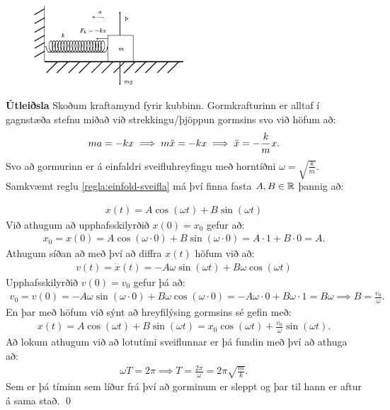 \ifdefined \wholebook \else\documentclass[oneside]{book}\usepackage{EdlBook}\graphicspath{{figures/}}
\begin{document}
\begin{minipage}{\linewidth}

\begin{figure}
\includegraphics[width=2.2in]{figures/forces-spring.pdf}
\end{figure}

\textbf{Útleiðsla} Skoðum kraftamynd fyrir kubbinn. Gormkrafturinn er alltaf í gagnstæða stefnu miðað við strekkingu/þjöppun gormsins svo við höfum að:
\begin{align*}
    ma = -kx \implies m\Ddot{x} = -kx \implies \Ddot{x} = - \frac{k}{m}x.
\end{align*}
Svo að gormurinn er á einfaldri sveifluhreyfingu með horntíðni $\omega = \sqrt{\frac{k}{m}}$. Samkvæmt reglu \ref{regla:einfold-sveifla} má því finna fasta $A, B \in \mathbb{R}$ þannig að:
\end{minipage}
\begin{align*}
    x(t) = A\cos(\omega t) + B\sin(\omega t)
\end{align*}
Við athugum að upphafsskilyrðið $x(0) = x_0$ gefur að:
\begin{align*}
    x_0 = x(0) = A \cos(\omega \cdot 0) + B \sin(\omega \cdot 0) = A \cdot 1  + B \cdot 0 = A.
\end{align*}
Athugum síðan að með því að diffra $x(t)$ höfum við að:
\begin{align*}
   v(t) = \dot{x}(t) = -A\omega \sin(\omega t) + B\omega \cos(\omega t)
\end{align*}
Upphafsskilyrðið $v(0) = v_0$ gefur þá að:
\begin{align*}
    v_0 = v(0) = -A\omega \sin(\omega \cdot 0) + B\omega \cos(\omega \cdot 0) = -A \omega \cdot 0 + B \omega \cdot 1 = B\omega \implies B = \frac{v_0}{\omega}.
\end{align*}
En þar með höfum við sýnt að hreyfilýsing gormsins sé gefin með:
\begin{align*}
    x(t) = A\cos(\omega t) + B\sin(\omega t) = x_0 \cos(\omega t) + \frac{v_0}{\omega} \sin(\omega t).
\end{align*}
Að lokum athugum við að lotutími sveiflunnar er þá fundin með því að athuga að:
\begin{align*}
    \omega T = 2\pi \implies T = \frac{2\pi}{\omega} = 2\pi \sqrt{\frac{m}{k}}.
\end{align*}
Sem er þá tíminn sem líður frá því að gorminum er sleppt og þar til hann er aftur á sama stað.
\qed
\end{document}
